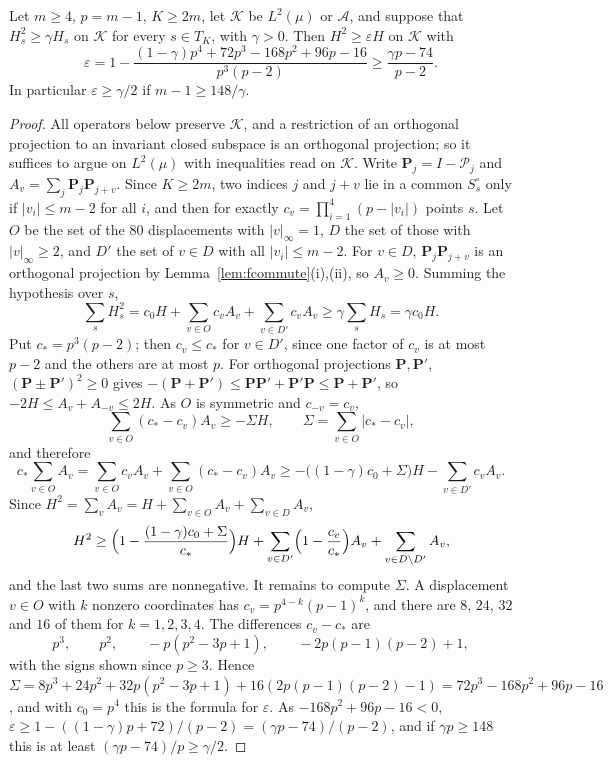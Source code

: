 \begin{lemma}\label{lem:knabe}
Let $m\ge4$, $p=m-1$, $K\ge2m$, let $\mathcal K$ be $L^2(\mu)$ or
$\mathcal A$, and suppose that $H_s^2\ge\gamma H_s$ on $\mathcal K$ for
every $s\in T_K$, with $\gamma>0$. Then $H^2\ge\varepsilon H$ on
$\mathcal K$ with
\[
\varepsilon=1-\frac{(1-\gamma)p^4+72p^3-168p^2+96p-16}{p^3(p-2)}\ge
\frac{\gamma p-74}{p-2}.
\]
In particular $\varepsilon\ge\gamma/2$ if $m-1\ge148/\gamma$.
\end{lemma}

\begin{proof}
All operators below preserve $\mathcal K$, and a restriction of an
orthogonal projection to an invariant closed subspace is an orthogonal
projection; so it suffices to argue on $L^2(\mu)$ with inequalities read on
$\mathcal K$. Write $\mathbf P_j=I-\mathcal P_j$ and $A_v=\sum_j\mathbf P_j
\mathbf P_{j+v}$. Since $K\ge2m$, two indices $j$ and $j+v$ lie in a common
$S^\circ_s$ only if $|v_i|\le m-2$ for all $i$, and then for exactly
$c_v=\prod_{i=1}^4(p-|v_i|)$ points $s$. Let $O$ be the set of the $80$
displacements with $|v|_\infty=1$, $D$ the set of those with
$|v|_\infty\ge2$, and $D'$ the set of $v\in D$ with all $|v_i|\le m-2$. For
$v\in D$, $\mathbf P_j\mathbf P_{j+v}$ is an orthogonal projection by
Lemma~\ref{lem:fcommute}(i),(ii), so $A_v\ge0$. Summing the hypothesis over
$s$,
\[
\sum_sH_s^2=c_0H+\sum_{v\in O}c_vA_v+\sum_{v\in D'}c_vA_v\ge\gamma\sum_sH_s
=\gamma c_0H .
\]
Put $c_*=p^3(p-2)$; then $c_v\le c_*$ for $v\in D'$, since one factor of
$c_v$ is at most $p-2$ and the others are at most $p$. For orthogonal
projections $\mathbf P,\mathbf P'$, $(\mathbf P\pm\mathbf P')^2\ge0$ gives
$-(\mathbf P+\mathbf P')\le\mathbf P\mathbf P'+\mathbf P'\mathbf P\le
\mathbf P+\mathbf P'$, so $-2H\le A_v+A_{-v}\le2H$. As $O$ is symmetric and
$c_{-v}=c_v$,
\[
\sum_{v\in O}(c_*-c_v)A_v\ge-\Sigma H,\qquad\Sigma=\sum_{v\in O}|c_*-c_v|,
\]
and therefore
\[
c_*\sum_{v\in O}A_v=\sum_{v\in O}c_vA_v+\sum_{v\in O}(c_*-c_v)A_v\ge
-\bigl((1-\gamma)c_0+\Sigma\bigr)H-\sum_{v\in D'}c_vA_v .
\]
Since $H^2=\sum_vA_v=H+\sum_{v\in O}A_v+\sum_{v\in D}A_v$,
\[
H^2\ge\Bigl(1-\frac{(1-\gamma)c_0+\Sigma}{c_*}\Bigr)H+\sum_{v\in D'}\Bigl(1-
\frac{c_v}{c_*}\Bigr)A_v+\sum_{v\in D\setminus D'}A_v ,
\]
and the last two sums are nonnegative. It remains to compute $\Sigma$. A
displacement $v\in O$ with $k$ nonzero coordinates has $c_v=p^{4-k}(p-1)^k$,
and there are $8$, $24$, $32$ and $16$ of them for $k=1,2,3,4$. The
differences $c_v-c_*$ are
\[
p^3,\qquad p^2,\qquad-p(p^2-3p+1),\qquad-2p(p-1)(p-2)+1,
\]
with the signs shown since $p\ge3$. Hence
$\Sigma=8p^3+24p^2+32p(p^2-3p+1)+16(2p(p-1)(p-2)-1)=72p^3-168p^2+96p-16$,
and with $c_0=p^4$ this is the formula for $\varepsilon$. As $-168p^2+96p
-16<0$, $\varepsilon\ge1-((1-\gamma)p+72)/(p-2)=(\gamma p-74)/(p-2)$, and if
$\gamma p\ge148$ this is at least $(\gamma p-74)/p\ge\gamma/2$.
\end{proof}

